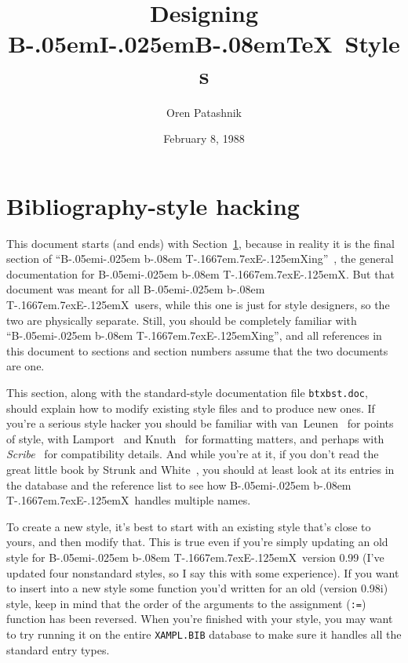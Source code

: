 
\def\BibTeX{{\rm B\kern-.05em{\sc i\kern-.025em b}\kern-.08em
    T\kern-.1667em\lower.7ex\hbox{E}\kern-.125emX}}

\title{Designing B\kern-.05em{\large I}\kern-.025em{\large B}\kern-.08em\TeX\
                                                                        Styles}
\author{Oren Patashnik}
\date{February 8, 1988}



\maketitle

\setcounter{section}{4}
\section{Bibliography-style hacking}
\label{style}

This document starts (and ends) with Section~\ref{style},
because in reality it is the final section of ``\BibTeX ing''~\cite{btxdoc},
the general documentation for \BibTeX.
But that document was meant for all \BibTeX\ users,
while this one is just for style designers,
so the two are physically separate.
Still, you should be completely familiar with ``\BibTeX ing''$\!$,
and all references in this document
to sections and section numbers
assume that the two documents are one.

This section,
along with the standard-style documentation file \hbox{\tt btxbst.doc},
should explain how to modify
existing style files and to produce new ones.
If you're a serious style hacker you should be familiar
with van~Leunen~\cite{van-leunen} for points of style,
with Lamport~\cite{latex} and Knuth~\cite{texbook} for formatting matters,
and perhaps with {\em Scribe\/}~\cite{scribe} for compatibility details.
And while you're at it, if you don't read the great little book by Strunk and
White~\cite{strunk-and-white}, you should at least look at its
entries in the database and the reference list
to see how \BibTeX\ handles multiple names.

To create a new style,
it's best to start with an existing style that's close to yours,
and then modify that.
This is true even if you're simply updating an old style
for \BibTeX\ version 0.99
(I've updated four nonstandard styles,
so I say this with some experience).
If you want to insert into a new style
some function you'd written for an old (version 0.98i) style,
keep in mind that the order of the arguments to
the assignment ({\tt :=}) function has been reversed.
When you're finished with your style,
you may want to try running it on the entire \hbox{\tt XAMPL.BIB} database
to make sure it handles all the standard entry types.

